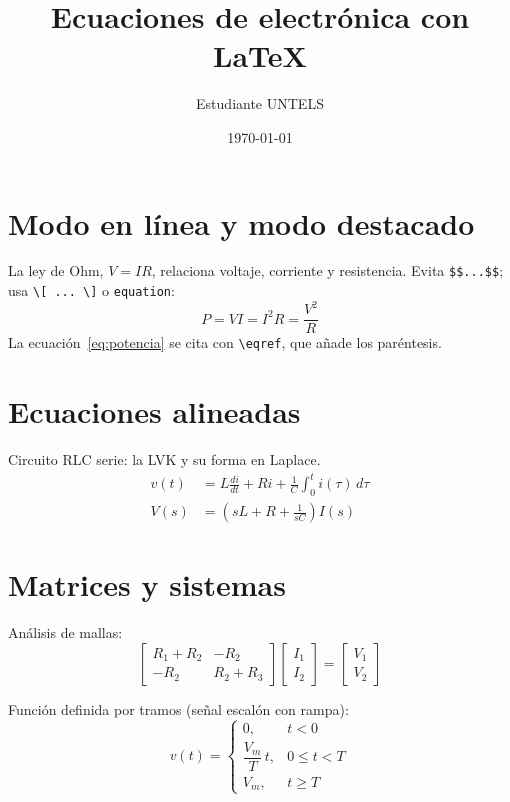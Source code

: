 \documentclass[12pt,a4paper]{article}
\title{Ecuaciones de electrónica con \LaTeX}
\author{Estudiante UNTELS}
\date{\today}
\begin{document}
\maketitle

\section{Modo en línea y modo destacado}
La ley de Ohm, $V = I R$, relaciona voltaje, corriente y resistencia.
Evita \texttt{\$\$...\$\$}; usa \texttt{\textbackslash[ ... \textbackslash]} o \texttt{equation}:
\begin{equation}
  P = VI = I^{2}R = \frac{V^{2}}{R}
  \label{eq:potencia}
\end{equation}
La ecuación~\eqref{eq:potencia} se cita con \verb|\eqref|, que añade los paréntesis.

\section{Ecuaciones alineadas}
Circuito RLC serie: la LVK y su forma en Laplace.
\begin{align}
  v(t) &= L\frac{di}{dt} + Ri + \frac{1}{C}\int_{0}^{t} i(\tau)\,d\tau \label{eq:rlc}\\
  V(s) &= \left(sL + R + \frac{1}{sC}\right) I(s) \label{eq:rlc_s}
\end{align}

\section{Matrices y sistemas}
Análisis de mallas:
\begin{equation}
  \begin{bmatrix}
    R_1 + R_2 & -R_2 \\
    -R_2 & R_2 + R_3
  \end{bmatrix}
  \begin{bmatrix} I_1 \\ I_2 \end{bmatrix}
  =
  \begin{bmatrix} V_1 \\ V_2 \end{bmatrix}
\end{equation}

Función definida por tramos (señal escalón con rampa):
\begin{equation}
  v(t) =
  \begin{cases}
    0, & t < 0 \\
    \dfrac{V_m}{T}\,t, & 0 \le t < T \\
    V_m, & t \ge T
  \end{cases}
\end{equation}
\end{document}
